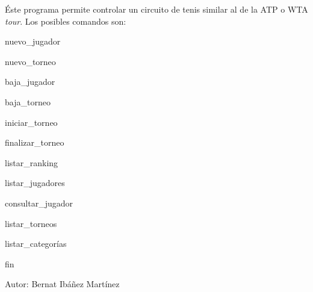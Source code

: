Éste programa permite controlar un circuito de tenis similar al de la ATP o WTA {\itshape tour}. Los posibles comandos son\+:
\begin{DoxyEnumerate}
\item nuevo\+\_\+jugador
\item nuevo\+\_\+torneo
\item baja\+\_\+jugador
\item baja\+\_\+torneo
\item iniciar\+\_\+torneo
\item finalizar\+\_\+torneo
\item listar\+\_\+ranking
\item listar\+\_\+jugadores
\item consultar\+\_\+jugador
\item listar\+\_\+torneos
\item listar\+\_\+categorías
\item fin
\end{DoxyEnumerate}

Autor\+: Bernat Ibáñez Martínez 